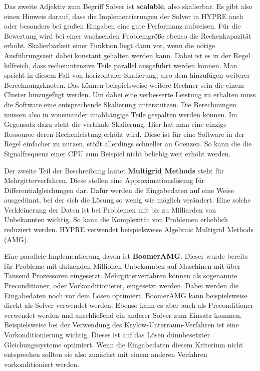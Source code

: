\documentclass[a4paper,10pt]{article}
\begin{document}
Das zweite Adjektiv zum Begriff Solver ist \textbf{scalable}, also skalierbar.
Es gibt also einen Hinweis darauf, dass die Implementierungen der Solver in HYPRE auch oder besonders bei großen Eingaben eine gute Performanz aufweisen.
Für die Bewertung wird bei einer wachsenden Problemgröße ebenso die Rechenkapazität erhöht.
Skalierbarkeit einer Funktion liegt dann vor, wenn die nötige Ausführungszeit dabei konstant gehalten werden kann.\cite{Henson00boomeramg}
Dabei ist es in der Regel hilfreich, dass rechenintensive Teile parallel ausgeführt werden können.
Man spricht in diesem Fall von horizontaler Skalierung, also dem hinzufügen weiterer Berechnungsknoten.
Das können beispielsweise weitere Rechner sein die einem Cluster hinzugefügt werden.
Um dabei eine verbesserte Leistung zu erhalten muss die Software eine entsprechende Skalierung unterstützen.
Die Berechnungen müssen also in voneinander unabhängige Teile gespalten werden können.
Im Gegensatz dazu steht die vertikale Skalierung.
Hier hat man eine einzige Ressource deren Rechenleistung erhöht wird.
Diese ist für eine Software in der Regel einfacher zu nutzen, stößt allerdings schneller an Grenzen.
So kann die die Signalfrequenz einer CPU zum Beispiel nicht beliebig weit erhöht werden.

Der zweite Teil der Beschreibung lautet \textbf{Multigrid Methods} steht für Mehrgitterverfahren.
Diese stellen eine Approximationslösung für Differentialgleichungen dar.
Dafür werden die Eingabedaten auf eine Weise ausgedünnt, bei der sich die Lösung so wenig wie möglich verändert.
Eine solche Verkleinerung der Daten ist bei Problemen mit bis zu Milliarden von Unbekannten wichtig.
So kann die Komplexität von Problemen erheblich reduziert werden.
HYPRE verwendet beispielsweise Algebraic Multigrid Methods (AMG).

Eine parallele Implementierung davon ist \textbf{BoomerAMG}.
Dieser wurde bereits für Probleme mit dutzenden Millionen Unbekannten auf Maschinen mit über Tausend Prozessoren eingesetzt.\cite{Henson00boomeramg}
Mehrgitterverfahren können als sogenannte Preconditioner, oder Vorkonditionierer, eingesetzt werden.
Dabei werden die Eingabedaten noch vor dem Lösen optimiert.
BoomerAMG kann beispielsweise direkt als Solver verwendet werden.
Ebenso kann es aber auch als Preconditioner verwendet werden und anschließend ein anderer Solver zum Einsatz kommen.
Beispielsweise bei der Verwendung des Krylow-Unterraum-Verfahren ist eine Vorkonditionierung wichtig. 
Dieses ist auf das Lösen dünnbesetzter Gleichungssysteme optimiert.
Wenn die Eingabedaten diesem Kriterium nicht entsprechen sollten sie also zunächst mit einem anderen Verfahren vorkonditioniert werden.
\end{document}
